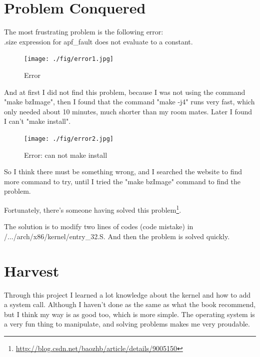 \documentclass[12pt,a4paper]{article}
\begin{document}
\section{Problem Conquered}

The most frustrating  problem is the following error:\\
     .size expression for apf\_fault does not evaluate to a constant.

\begin{figure}[H]
	\centering
	\texttt{[image: ./fig/error1.jpg]}
	\caption{Error}
\end{figure}

And at first I did not find this problem, because I was not using the command "make bzImage", then I found that the command "make -j4" runs very fast, which only needed about 10 minutes, much shorter than my room mates. Later I found I can’t "make install".

\begin{figure}[H]
	\centering
	\texttt{[image: ./fig/error2.jpg]}
	\caption{Error: can not make install}
\end{figure}

So I think there must be something wrong, and I searched the website to find more command to try, until I tried the "make bzImage" command to find the problem.

Fortunately, there’s someone having solved this problem\footnote{\url{http://blog.csdn.net/baozhb/article/details/9005150}}. 

The solution is to modify two lines of codes (code mistake) in /.../arch/x86/kernel/entry\_32.S. And then the problem is solved quickly.


\section{Harvest}

Through this project I learned a lot knowledge about the kernel and how to add a system call. Although I haven’t done as the same as what the book recommend, but I think my way is as good too, which is more simple. The operating system is a very fun thing to manipulate, and solving problems makes me very proudable.
\end{document}
